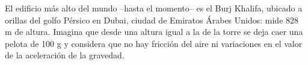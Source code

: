 \question El edificio más alto del mundo --hasta el momento-- es
el Burj Khalifa, ubicado a orillas del golfo Pérsico en Dubai,
ciudad de Emiratos Árabes Unidos: mide 828 m de altura.
Imagina que desde una altura igual a la de la torre se
deja caer una pelota de 100 g y considera que no hay
fricción del aire ni variaciones en el valor de la aceleración
de la gravedad.

\begin{parts}
    
    
    
    
    
    
\end{parts}
